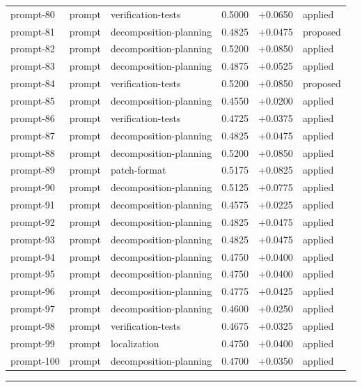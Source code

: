 \begin{center}
\begin{longtable}{llp{5.2cm}rrl}
prompt-80 & prompt & verification-tests & 0.5000 & +0.0650 & applied \\
prompt-81 & prompt & decomposition-planning & 0.4825 & +0.0475 & proposed \\
prompt-82 & prompt & decomposition-planning & 0.5200 & +0.0850 & applied \\
prompt-83 & prompt & decomposition-planning & 0.4875 & +0.0525 & applied \\
prompt-84 & prompt & verification-tests & 0.5200 & +0.0850 & proposed \\
prompt-85 & prompt & decomposition-planning & 0.4550 & +0.0200 & applied \\
prompt-86 & prompt & verification-tests & 0.4725 & +0.0375 & applied \\
prompt-87 & prompt & decomposition-planning & 0.4825 & +0.0475 & applied \\
prompt-88 & prompt & decomposition-planning & 0.5200 & +0.0850 & applied \\
prompt-89 & prompt & patch-format & 0.5175 & +0.0825 & applied \\
prompt-90 & prompt & decomposition-planning & 0.5125 & +0.0775 & applied \\
prompt-91 & prompt & decomposition-planning & 0.4575 & +0.0225 & applied \\
prompt-92 & prompt & decomposition-planning & 0.4825 & +0.0475 & applied \\
prompt-93 & prompt & decomposition-planning & 0.4825 & +0.0475 & applied \\
prompt-94 & prompt & decomposition-planning & 0.4750 & +0.0400 & applied \\
prompt-95 & prompt & decomposition-planning & 0.4750 & +0.0400 & applied \\
prompt-96 & prompt & decomposition-planning & 0.4775 & +0.0425 & applied \\
prompt-97 & prompt & decomposition-planning & 0.4600 & +0.0250 & applied \\
prompt-98 & prompt & verification-tests & 0.4675 & +0.0325 & applied \\
prompt-99 & prompt & localization & 0.4750 & +0.0400 & applied \\
prompt-100 & prompt & decomposition-planning & 0.4700 & +0.0350 & applied \\
\bottomrule\end{longtable}\end{center}
\par\bigskip\hrule\bigskip

